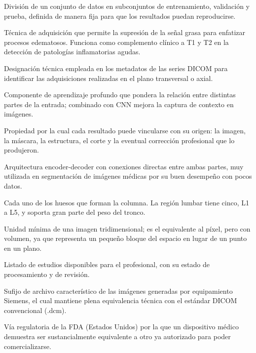 \begin{description}[leftmargin=3.8cm, style=nextline, itemsep=3pt, topsep=3pt]
    \item[Split] División de un conjunto de datos en subconjuntos de entrenamiento, validación y prueba, definida de manera fija para que los resultados puedan reproducirse.

    \item[STIR (Short Tau Inversion Recovery)] Técnica de adquisición que permite la supresión de la señal grasa para enfatizar procesos edematosos. Funciona como complemento clínico a T1 y T2 en la detección de patologías inflamatorias agudas.

    \item[TRA (transverse)] Designación técnica empleada en los metadatos de las series DICOM para identificar las adquisiciones realizadas en el plano transversal o axial.

    \item[Transformer / mecanismo de atención] Componente de aprendizaje profundo que pondera la relación entre distintas partes de la entrada; combinado con CNN mejora la captura de contexto en imágenes.

    \item[Trazabilidad] Propiedad por la cual cada resultado puede vincularse con su origen: la imagen, la máscara, la estructura, el corte y la eventual corrección profesional que lo produjeron.

    \item[U-Net] Arquitectura encoder-decoder con conexiones directas entre ambas partes, muy utilizada en segmentación de imágenes médicas por su buen desempeño con pocos datos.

    \item[Vértebra] Cada uno de los huesos que forman la columna. La región lumbar tiene cinco, L1 a L5, y soporta gran parte del peso del tronco.

    \item[Vóxel] Unidad mínima de una imagen tridimensional; es el equivalente al píxel, pero con volumen, ya que representa un pequeño bloque del espacio en lugar de un punto en un plano.

    \item[Worklist] Listado de estudios disponibles para el profesional, con su estado de procesamiento y de revisión.

    \item[Archivo .ima] Sufijo de archivo característico de las imágenes generadas por equipamiento Siemens, el cual mantiene plena equivalencia técnica con el estándar DICOM convencional (.dcm).

    \item[510(k)] Vía regulatoria de la FDA (Estados Unidos) por la que un dispositivo médico demuestra ser sustancialmente equivalente a otro ya autorizado para poder comercializarse.

\end{description}
